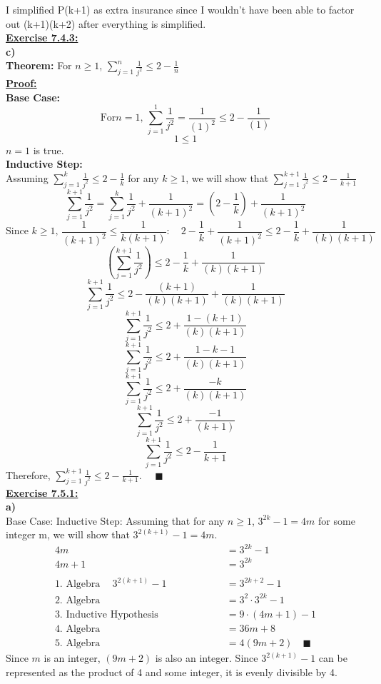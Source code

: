 \documentclass[12pt, letterpaper, twoside]{article}
\begin{document}
\indent I simplified P(k+1) as extra insurance since I wouldn't have been able to factor out (k+1)(k+2) after everything is simplified.\\
\break
\newpage\noindent \textbf{\underline{Exercise 7.4.3:}}\\
\textbf{c)}\\
\noindent\textbf{Theorem:} For $n \geq 1$, $\sum_{j=1}^{n}\frac{1}{j^2} \leq 2 - \frac{1}{n}$\\
\break
\noindent\textbf{\underline{Proof:}}\\
\break
\textbf{Base Case:}
\[\text{For} n = 1\text{, } \sum_{j=1}^{1}\frac{1}{j^2} = \frac{1}{(1)^2} \leq 2 - \frac{1}{(1)}\]
\[1 \leq 1\]
$n = 1$ is true.\\
\break
\noindent\textbf{Inductive Step:}\\
 Assuming $\sum_{j=1}^{k}\frac{1}{j^2}\leq 2 - \frac{1}{k}$ for any $k \geq 1$, we will show that $\sum_{j=1}^{k+1}\frac{1}{j^2}\leq 2 - \frac{1}{k+1}$\\
\[\sum_{j=1}^{k+1}\frac{1}{j^2} = \sum_{j=1}^{k}\frac{1}{j^2} + \frac{1}{(k+1)^2} = (2 - \frac{1}{k}) + \frac{1}{(k+1)^2}\]
\[\text{Since } k \geq 1 \text{, } \frac{1}{(k+1)^2} \leq \frac{1}{k(k+1)} : \quad 2 - \frac{1}{k} + \frac{1}{(k+1)^2} \leq 2 - \frac{1}{k} + \frac{1}{(k)(k+1)}\]
\[(\sum_{j=1}^{k+1}\frac{1}{j^2}) \leq 2 - \frac{1}{k} + \frac{1}{(k)(k+1)}\]
\[\sum_{j=1}^{k+1}\frac{1}{j^2} \leq 2 - \frac{(k + 1)}{(k)(k + 1)} + \frac{1}{(k)(k+1)}\]
\[\sum_{j=1}^{k+1}\frac{1}{j^2} \leq 2 + \frac{1 - (k + 1)}{(k)(k + 1)}\]  
\[\sum_{j=1}^{k+1}\frac{1}{j^2} \leq 2 + \frac{1 - k - 1 }{(k)(k + 1)}\]  
\[\sum_{j=1}^{k+1}\frac{1}{j^2} \leq 2 + \frac{-k}{(k)(k + 1)}\]
\[\sum_{j=1}^{k+1}\frac{1}{j^2} \leq 2 + \frac{-1}{(k + 1)}\] 
\[\sum_{j=1}^{k+1}\frac{1}{j^2} \leq 2 - \frac{1}{k + 1}\]
Therefore, $\sum_{j=1}^{k+1}\frac{1}{j^2}\leq 2 - \frac{1}{k+1}$. $\quad\blacksquare$\\
\break
\newpage\noindent \textbf{\underline{Exercise 7.5.1:}}\\
\break
\textbf{a)}\\
Base Case:
Inductive Step:
Assuming that for any $n \geq 1$, $3^{2k} - 1 = 4m$ for some integer m, we will show that $3^{2(k+1)} - 1 = 4m$.\\
\begin{align*}
4m &= 3^{2k} - 1\\
4m + 1 &= 3^{2k}\\
\\
\text{1. Algebra}\ \quad 3^{2(k+1)} - 1 &= 3^{2k+2} - 1\\
\text{2. Algebra} \qquad\quad\quad\quad\quad &= 3^2 \cdot 3^{2k} - 1\\
\text{3. Inductive Hypothesis} \qquad\quad\quad\quad\quad &= 9\cdot (4m + 1) - 1\\
\text{4. Algebra} \qquad\quad\quad\quad\quad &= 36m + 8\\
\text{5. Algebra} \qquad\quad\quad\quad\quad &= 4(9m + 2) \quad\blacksquare
\end{align*}
Since $m$ is an integer, $(9m + 2)$ is also an integer. Since $3^{2(k+1)} - 1$ can be represented as the product of 4 and some integer, it is evenly divisible by 4.\\
\break
\end{document}
